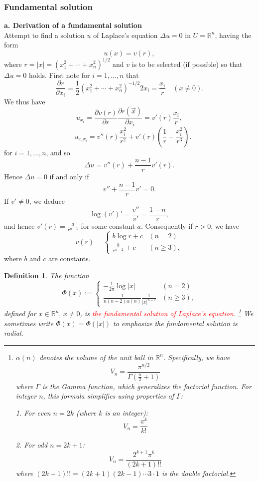 \documentclass[a4paper,12pt]{report}
\newtheorem{definition}{Definition}[section]
\begin{document}
\subsubsection{Fundamental solution}
\textbf{a. Derivation of a fundamental solution}\\
Attempt to find a solution \( u \) of Laplace's equation \(\Delta u =0\) 
in \( U = \mathbb{R}^n \), having the form
\[
u(x) = v(r),
\]
where \( r = |x| = (x_1^2 + \cdots + x_n^2)^{1/2} \) and \( v \) is to be selected (if possible) so that \( \Delta u = 0 \) holds. First note for \( i = 1, \dots, n \) that
\[
\frac{\partial r}{\partial x_i} = \frac{1}{2} \left( x_1^2 + \cdots + x_n^2 \right)^{-1/2} 2x_i = \frac{x_i}{r} \quad (x \neq 0).
\]
We thus have
\[
u_{x_i} = \frac{\partial v(r)}{\partial r} \frac{\partial r(\vec{x})}{\partial x_i} = v'(r) \frac{x_i}{r},
\]
\[\quad u_{x_i x_i} = v''(r) \frac{x_i^2}{r^2} + v'(r) \left( \frac{1}{r} - \frac{x_i^2}{r^3} \right).\]
for \( i = 1, \dots, n \), and so
\[
\Delta u = v''(r) + \frac{n - 1}{r} v'(r).
\]
Hence \( \Delta u = 0 \) if and only if
\[
v'' + \frac{n - 1}{r} v' = 0.
\]
If \( v' \neq 0 \), we deduce
\[
\log(v')' = \frac{v''}{v'} = \frac{1 - n}{r},
\]
and hence \( v'(r) = \frac{a}{r^{n-1}} \) for some constant \( a \). Consequently if \( r > 0 \), we have
\[
v(r) = \begin{cases} 
b \log r + c & (n = 2) \\ 
\frac{b}{r^{n-2}} + c & (n \geq 3),
\end{cases}
\]
where \( b \) and \( c \) are constants.
\begin{definition}
The function
\[
\Phi(x) := \begin{cases} 
-\frac{1}{2\pi} \log |x| & (n = 2) \\ 
\frac{1}{n(n-2)\alpha(n)} \frac{1}{|x|^{n-2}} & (n \geq 3),
\end{cases}
\]
defined for \( x \in \mathbb{R}^n, \, x \neq 0 \), is \textcolor{red}{the fundamental solution of Laplace's equation}. \footnote{\(\alpha (n)\) denotes the volume of the unit ball in \(\mathbb{R}^n\). Specifically, we have\\
\[
V_n = \frac{\pi^{n/2}}{\Gamma\left(\frac{n}{2} + 1\right)}
\]
where \( \Gamma \) is the Gamma function, which generalizes the factorial function. For integer \( n \), this formula simplifies using properties of \( \Gamma \):

1. For even \( n = 2k \) (where \( k \) is an integer):
   \[
   V_n = \frac{\pi^k}{k!}
   \]

2. For odd \( n = 2k + 1 \):
   \[
   V_n = \frac{2^{k+1} \pi^k}{(2k+1)!!}
   \]
   where \( (2k+1)!! = (2k+1)(2k-1)\cdots3\cdot1 \) is the double factorial.
} 
We sometimes write \(\Phi (x) = \Phi (|x|)\) to emphasize the fundamental solution is radial. 
\end{definition}
\end{document}
